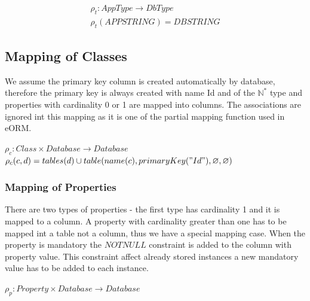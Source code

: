 \documentclass[11pt]{article}
\begin{document}
\begin{equation*}
\begin{gathered}
	\rho_{t} : AppType \rightarrow DbType  \\
 	\rho_{t}(APPSTRING) = DBSTRING 
\end{gathered}
\end{equation*}

\subsection{Mapping of Classes}
We assume the primary key column is created automatically by database, therefore the primary key is always created with name Id and of the $\mathbb{N^{*}}$ type and properties with cardinality 0 or 1 are mapped into columns. The associations are ignored int this mapping as it is one of the partial mapping function used in eORM.

\begin{center}
$\rho_{c}: Class \times Database \rightarrow Database $ \\ 
$\rho_{c}(c,d) = tables(d) \cup table(name(c), primaryKey("Id"), \varnothing, \varnothing) $
\end{center}

\subsubsection{Mapping of Properties}
There are two types of properties - the first type has cardinality 1  and it is mapped to a column. A property with cardinality greater than one has to be mapped int a table not a column, thus we have a special mapping case. When the property is mandatory the $NOTNULL$ constraint is added to the column with property value. This constraint affect already stored instances a new mandatory value has to be added to each instance.

$
\rho_p : Property \times Database \rightarrow Database 
$
\end{document}

